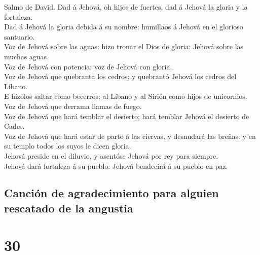  Salmo de David. Dad á Jehová, oh hijos de fuertes, dad á
Jehová la gloria y la fortaleza.\\
 Dad á Jehová la gloria debida á su nombre: humillaos á
Jehová en el glorioso santuario.\\
 Voz de Jehová sobre las aguas: hizo tronar el Dios de
gloria: Jehová sobre las muchas aguas.\\
 Voz de Jehová con potencia; voz de Jehová con gloria.\\
 Voz de Jehová que quebranta los cedros; y quebrantó
Jehová los cedros del Líbano.\\
 E hízolos saltar como becerros; al Líbano y al Sirión
como hijos de unicornios.\\
 Voz de Jehová que derrama llamas de fuego.\\
 Voz de Jehová que hará temblar el desierto; hará temblar
Jehová el desierto de Cades.\\
 Voz de Jehová que hará estar de parto á las ciervas, y
desnudará las breñas: y en su templo todos los suyos le dicen gloria.\\
 Jehová preside en el diluvio, y asentóse Jehová por rey
para siempre.\\
 Jehová dará fortaleza á su pueblo: Jehová bendecirá á su
pueblo en paz.

\hypertarget{canciuxf3n-de-agradecimiento-para-alguien-rescatado-de-la-angustia}{%
\subsection{Canción de agradecimiento para alguien rescatado de la
angustia}\label{canciuxf3n-de-agradecimiento-para-alguien-rescatado-de-la-angustia}}

\hypertarget{section-19-30}{%
\section{30}\label{section-19-30}}

